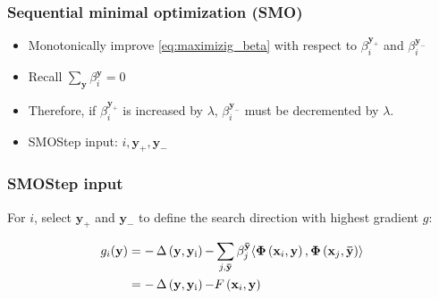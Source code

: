 \begin{frame}
    \frametitle{Sequential minimal optimization (SMO)}
    \begin{itemize}
        \item Monotonically improve \eqref{eq:maximizig_beta} with respect to
            \(\beta_i^{\mathbf{y}_+}\) and \(\beta_i^{\mathbf{y}_-}\) 
        \item Recall \( \sum_\mathbf{y} \beta_i^\mathbf{y} = 0 \)
        \item Therefore, if \( \beta_i^{\mathbf{y}_+} \) is increased by \(\lambda\),
            \( \beta_i^{\mathbf{y}_-} \) must be decremented by \(\lambda\).
        \item SMOStep input: \(i, \mathbf{y}_+, \mathbf{y}_-\)
    \end{itemize}
\end{frame}

\begin{frame}
    \frametitle{SMOStep input}
    For \(i\), select \(\mathbf{y}_+\) and \(\mathbf{y}_-\) to define the search direction with
    highest gradient \(g\):

    \begin{equation}
        \begin{aligned}
            g_i(\mathbf{y}) &= -\operatorname{\Delta \left( \mathbf{y}, \mathbf{y}_i \right)} - \sum_{j, \mathbf{\bar{y}}} \beta_j^\mathbf{\bar{y}}
            \langle \mathbf{\Phi}\left(\mathbf{x}_i, \mathbf{y}\right), \mathbf{\Phi}\left(\mathbf{x}_j,
            \mathbf{\bar{y}}\right) \rangle \\
            &= -\operatorname{\Delta \left( \mathbf{y}, \mathbf{y}_i \right)} - F\left(\mathbf{x}_i, \mathbf{y}\right)
        \end{aligned}
    \end{equation}
\end{frame}


